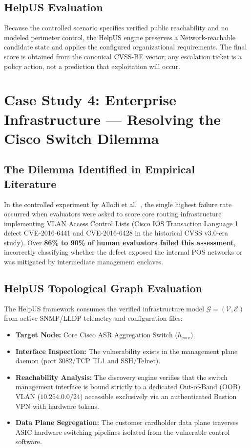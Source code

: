 \subsection{HelpUS Evaluation}
Because the controlled scenario specifies verified public reachability and no modeled perimeter control, the HelpUS engine preserves a Network-reachable candidate state and applies the configured organizational requirements. The final score is obtained from the canonical CVSS-BE vector; any escalation ticket is a policy action, not a prediction that exploitation will occur.

\section{Case Study 4: Enterprise Infrastructure — Resolving the Cisco Switch Dilemma}
\label{sec:case_study_cisco}
\subsection{The Dilemma Identified in Empirical Literature}
In the controlled experiment by Allodi et al.~\cite{santos2017estimating}, the single highest failure rate occurred when evaluators were asked to score core routing infrastructure implementing VLAN Access Control Lists (Cisco IOS Transaction Language 1 defect CVE-2016-6441 and CVE-2016-6428 in the historical CVSS v3.0-era study). Over \textbf{86\% to 90\% of human evaluators failed this assessment}, incorrectly classifying whether the defect exposed the internal POS networks or was mitigated by intermediate management enclaves.

\subsection{HelpUS Topological Graph Evaluation}
The HelpUS framework consumes the verified infrastructure model $\mathcal{G} = (\mathcal{V}, \mathcal{E})$ from active SNMP/LLDP telemetry and configuration files:
\begin{itemize}
    \item \textbf{Target Node:} Core Cisco ASR Aggregation Switch ($h_{\text{core}}$).
    \item \textbf{Interface Inspection:} The vulnerability exists in the management plane daemon (port 3082/TCP TL1 and SSH/Telnet).
    \item \textbf{Reachability Analysis:} The discovery engine verifies that the switch management interface is bound strictly to a dedicated Out-of-Band (OOB) VLAN ($10.254.0.0/24$) accessible exclusively via an authenticated Bastion VPN with hardware tokens.
    \item \textbf{Data Plane Segregation:} The customer cardholder data plane traverses ASIC hardware switching pipelines isolated from the vulnerable control software.
\end{itemize}

